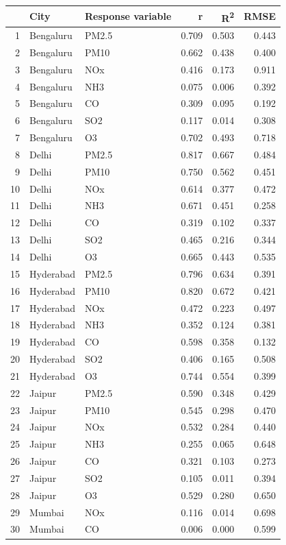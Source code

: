 \documentclass[twoside,11pt]{article}
\begin{document}
\begin{table}[ht]
\centering
\begin{tabular}{rllrrr}
  \hline
  & City & Response variable & r & R\textsuperscript{2} & RMSE \\
  \hline
1 & Bengaluru & PM2.5 & 0.709 & 0.503 & 0.443 \\ 
  2 & Bengaluru & PM10 & 0.662 & 0.438 & 0.400 \\ 
  3 & Bengaluru & NOx & 0.416 & 0.173 & 0.911 \\ 
  4 & Bengaluru & NH3 & 0.075 & 0.006 & 0.392 \\ 
  5 & Bengaluru & CO & 0.309 & 0.095 & 0.192 \\ 
  6 & Bengaluru & SO2 & 0.117 & 0.014 & 0.308 \\ 
  7 & Bengaluru & O3 & 0.702 & 0.493 & 0.718 \\ 
  8 & Delhi & PM2.5 & 0.817 & 0.667 & 0.484 \\ 
  9 & Delhi & PM10 & 0.750 & 0.562 & 0.451 \\ 
  10 & Delhi & NOx & 0.614 & 0.377 & 0.472 \\ 
  11 & Delhi & NH3 & 0.671 & 0.451 & 0.258 \\ 
  12 & Delhi & CO & 0.319 & 0.102 & 0.337 \\ 
  13 & Delhi & SO2 & 0.465 & 0.216 & 0.344 \\ 
  14 & Delhi & O3 & 0.665 & 0.443 & 0.535 \\ 
  15 & Hyderabad & PM2.5 & 0.796 & 0.634 & 0.391 \\ 
  16 & Hyderabad & PM10 & 0.820 & 0.672 & 0.421 \\ 
  17 & Hyderabad & NOx & 0.472 & 0.223 & 0.497 \\ 
  18 & Hyderabad & NH3 & 0.352 & 0.124 & 0.381 \\ 
  19 & Hyderabad & CO & 0.598 & 0.358 & 0.132 \\ 
  20 & Hyderabad & SO2 & 0.406 & 0.165 & 0.508 \\ 
  21 & Hyderabad & O3 & 0.744 & 0.554 & 0.399 \\ 
  22 & Jaipur & PM2.5 & 0.590 & 0.348 & 0.429 \\ 
  23 & Jaipur & PM10 & 0.545 & 0.298 & 0.470 \\ 
  24 & Jaipur & NOx & 0.532 & 0.284 & 0.440 \\ 
  25 & Jaipur & NH3 & 0.255 & 0.065 & 0.648 \\ 
  26 & Jaipur & CO & 0.321 & 0.103 & 0.273 \\ 
  27 & Jaipur & SO2 & 0.105 & 0.011 & 0.394 \\ 
  28 & Jaipur & O3 & 0.529 & 0.280 & 0.650 \\ 
  29 & Mumbai & NOx & 0.116 & 0.014 & 0.698 \\ 
  30 & Mumbai & CO & 0.006 & 0.000 & 0.599 \\ 
    \hline
\end{tabular}
\end{table}
\end{document}

